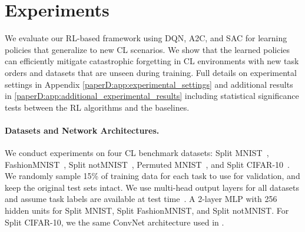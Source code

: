 
\section{Experiments}\label{paperD:sec:experiments}


We evaluate our RL-based framework using DQN, A2C, and SAC for learning policies that generalize to new CL scenarios. We show that the learned policies can efficiently mitigate catastrophic forgetting in CL environments with new task orders and datasets that are unseen during training. Full details on experimental settings in Appendix \ref{paperD:app:experimental_settings} and additional results in \ref{paperD:app:additional_experimental_results} including statistical significance tests between the RL algorithms and the baselines.  


\vspace{-3mm}
\paragraph{Datasets and Network Architectures.} We conduct experiments on four CL benchmark datasets: Split MNIST~, FashionMNIST~, Split notMNIST~, Permuted MNIST~, and Split CIFAR-10~. We randomly sample 15\% of training data for each task to use for validation, and keep the original test sets intact. 
We use multi-head output layers for all datasets and assume task labels are available at test time~. A 2-layer MLP with 256 hidden units for Split MNIST, Split FashionMNIST, and Split notMNIST. For Split CIFAR-10, we the same ConvNet architecture used in .

\vspace{-3mm}
